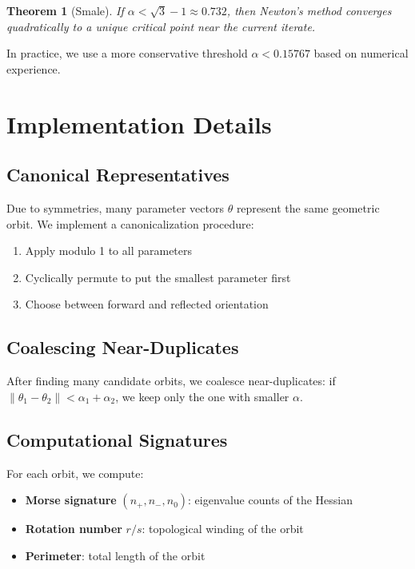 \documentclass[11pt]{article}
\theoremstyle{plain}
\newtheorem{theorem}{Theorem}
\theoremstyle{definition}
\theoremstyle{remark}
\begin{document}
\begin{theorem}[Smale]
If $\alpha < \sqrt{3} - 1 \approx 0.732$, then Newton's method converges quadratically to a unique critical point near the current iterate.
\end{theorem}

In practice, we use a more conservative threshold $\alpha < 0.15767$ based on numerical experience.

\section{Implementation Details}

\subsection{Canonical Representatives}

Due to symmetries, many parameter vectors $\theta$ represent the same geometric orbit. We implement a canonicalization procedure:
\begin{enumerate}
\item Apply modulo 1 to all parameters
\item Cyclically permute to put the smallest parameter first
\item Choose between forward and reflected orientation
\end{enumerate}

\subsection{Coalescing Near-Duplicates}

After finding many candidate orbits, we coalesce near-duplicates: if $\|\theta_1 - \theta_2\| < \alpha_1 + \alpha_2$, we keep only the one with smaller $\alpha$.

\subsection{Computational Signatures}

For each orbit, we compute:
\begin{itemize}
\item \textbf{Morse signature} $(n_+, n_-, n_0)$: eigenvalue counts of the Hessian
\item \textbf{Rotation number} $r/s$: topological winding of the orbit
\item \textbf{Perimeter}: total length of the orbit
\end{itemize}
\end{document}
